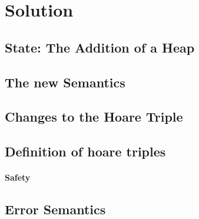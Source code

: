 \section{Solution}
\subsection{State: The Addition of a Heap}
\subsection{The new Semantics}
\subsection{Changes to the Hoare Triple}
\subsection{Definition of hoare triples}
\paragraph{Safety}
\subsection{Error Semantics}

